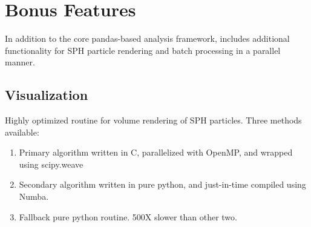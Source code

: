 \section{Bonus Features}
In addition to the core pandas-based analysis framework,  includes additional functionality for SPH particle rendering and batch processing in a parallel manner.

\subsection{Visualization}
\label{sec:vis}

Highly optimized routine for volume rendering of SPH particles.  Three methods available:
\begin{enumerate}
\item Primary algorithm written in C, parallelized with OpenMP, and wrapped using scipy.weave
\item Secondary algorithm written in pure python, and just-in-time compiled using Numba.
\item Fallback pure python routine.  500X slower than other two.
\end{enumerate}